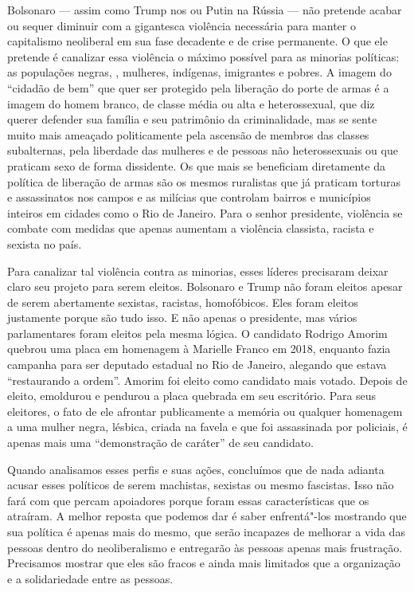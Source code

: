 Bolsonaro --- assim como Trump nos  ou Putin na Rússia --- não pretende acabar ou sequer diminuir com a gigantesca violência necessária para manter o capitalismo neoliberal em sua fase decadente e de crise permanente. O que ele pretende é canalizar essa violência o máximo possível para as minorias políticas: as populações negras, , mulheres, indígenas, imigrantes e pobres. A imagem do ``cidadão de bem'' que quer ser protegido pela liberação do porte de armas é a imagem do homem branco, de classe média ou alta e heterossexual, que diz querer defender sua família e seu patrimônio da criminalidade, mas se sente muito mais ameaçado politicamente pela ascensão de membros das classes subalternas, pela liberdade das mulheres e de pessoas não heterossexuais ou que praticam sexo de forma dissidente. Os que mais se beneficiam diretamente da política de liberação de armas são os mesmos ruralistas que já praticam torturas e assassinatos nos campos e as milícias que controlam bairros e municípios inteiros em cidades como o Rio de Janeiro. Para o senhor presidente, violência se combate com medidas que apenas aumentam a violência classista, racista e sexista no país.

Para canalizar tal violência contra as minorias, esses líderes precisaram deixar claro seu projeto para serem eleitos. Bolsonaro e Trump não foram eleitos apesar de serem abertamente sexistas, racistas, homofóbicos. Eles foram eleitos justamente porque são tudo isso. E não apenas o presidente, mas vários parlamentares foram eleitos pela mesma lógica. O candidato Rodrigo Amorim quebrou uma placa em homenagem à Marielle Franco em 2018, enquanto fazia campanha para ser deputado estadual no Rio de Janeiro, alegando que estava ``restaurando a ordem''. Amorim foi eleito como candidato mais votado. Depois de eleito, emoldurou e pendurou a placa quebrada em seu escritório. Para seus eleitores, o fato de ele afrontar publicamente a memória ou qualquer homenagem a uma mulher negra, lésbica, criada na favela e que foi assassinada por policiais, é apenas mais uma ``demonstração de caráter'' de seu candidato.

Quando analisamos esses perfis e suas ações, concluímos que de nada adianta acusar esses políticos de serem machistas, sexistas ou mesmo fascistas. Isso não fará com que percam apoiadores porque foram essas características que os atraíram. A melhor reposta que podemos dar é saber enfrentá"-los mostrando que sua política é apenas mais do mesmo, que serão incapazes de melhorar a vida das pessoas dentro do neoliberalismo e entregarão às pessoas apenas mais frustração. Precisamos mostrar que eles são fracos e ainda mais limitados que a organização e a solidariedade entre as pessoas.

